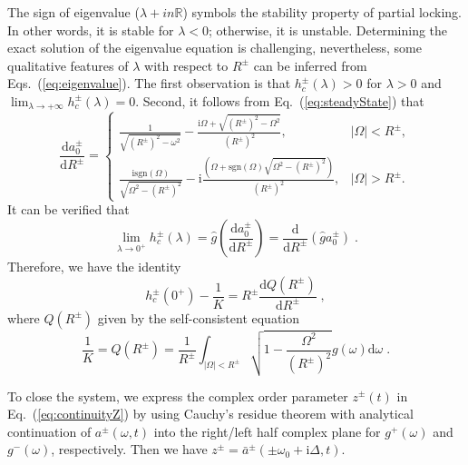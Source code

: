 \documentclass{article}
\begin{document}
The sign of eigenvalue ($\lambda+in \mathbb{R}$) symbols the stability property of partial locking. In other words, it is stable for $\lambda<0$; otherwise, it is unstable. Determining the exact solution of the eigenvalue equation is challenging, nevertheless, some qualitative features of $\lambda$ with respect to $R^{\pm}$ can be inferred from Eqs.~(\ref{eq:eigenvalue}). The first observation is that $h_c^{\pm}(\lambda) > 0$ for $\lambda > 0$ and $\lim_{\lambda \rightarrow +\infty} h_{c}^{\pm}\left( \lambda \right) =0$. Second, it follows from Eq.~(\ref{eq:steadyState}) that
{
\small
\begin{equation}
    \frac{\mathrm{d} a_{0}^{\pm}}{\mathrm{d}R^{\pm}}=\begin{cases}
        \frac{1}{\sqrt{\left( R^{\pm} \right) ^2-\omega ^2}}-\frac{\mathrm{i}\Omega +\sqrt{\left( R^{\pm} \right) ^2-\Omega ^2}}{\left( R^{\pm} \right) ^2},&		|\Omega |<R^{\pm},\\
        \frac{\mathrm{i}\text{sgn}\left(\Omega \right)}{\sqrt{\Omega ^2-\left( R^{\pm} \right) ^2}}-\mathrm{i}\frac{(\Omega +\text{sgn}\left(\Omega \right)\sqrt{\Omega ^2-\left( R^{\pm} \right) ^2})}{\left( R^{\pm} \right) ^2},&		|\Omega |>R^{\pm}.
    \end{cases}
\end{equation} 
}
It can be verified that
\begin{equation}
    \lim_{\lambda \rightarrow 0^+} h_{c}^{\pm}\left( \lambda \right)=\hat{g}\left( \frac{\mathrm{d}a_{0}^{\pm}}{\mathrm{d}R^{\pm}} \right) =\frac{\mathrm{d}}{\mathrm{d}R^{\pm}}\left( \hat{g}a_{0}^{\pm} \right) \;.
\end{equation}
Therefore, we have the identity
\begin{equation}
    h_{c}^{\pm}\left( 0^+ \right) -\frac{1}{K}=R^{\pm}\frac{\mathrm{d}Q\left( R^{\pm} \right)}{\mathrm{d}R^{\pm}}\;,
\end{equation}
where $Q\left( R^{\pm} \right)$ given by the self-consistent equation
\begin{equation}
    \frac{1}{K}=Q\left( R^{\pm} \right) =\frac{1}{R^{\pm}}\int_{\left| \Omega \right|<R^{\pm}}{\sqrt{1-\frac{\Omega ^2}{\left( R^{\pm} \right) ^2}}g\left( \omega \right) \mathrm{d}\omega}\;.
\end{equation}

\color{blue}

To close the system, we express the complex order parameter $z^{\pm}\left( t \right)$ in Eq.~(\ref{eq:continuityZ}) by using Cauchy’s residue theorem with analytical continuation of $a^{\pm}\left( \omega ,t \right)$ into the right/left half complex plane for $g^{+}\left(\omega\right)$ and $g^{-}\left(\omega\right)$, respectively. Then we have $z^{\pm}=\bar{a}^{\pm}\left( \pm\omega _0+\mathrm{i}\Delta ,t \right) $.
\end{document}
